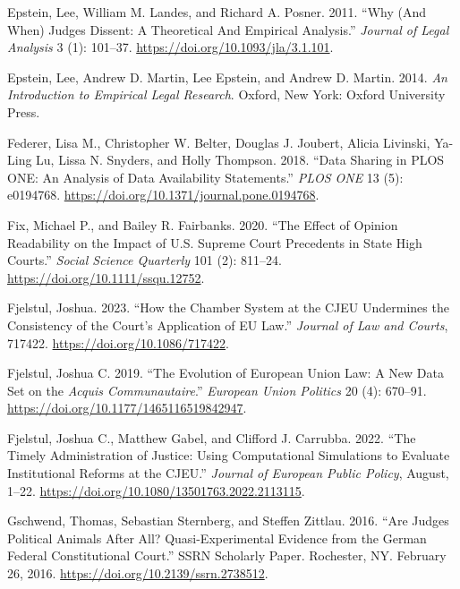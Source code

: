 \documentclass[
  11pt,
]{article}
\newlength{\cslhangindent}
\newenvironment{CSLReferences}[2] %
 {%
  \setlength{\parindent}{0pt}
  \ifodd #1 \everypar{\setlength{\hangindent}{\cslhangindent}}\ignorespaces\fi
  \ifnum #2 > 0
  \setlength{\parskip}{#2\baselineskip}
  \fi
 }%
 {}
\begin{document}
\begin{CSLReferences}{1}{0}
\leavevmode{}%
Epstein, Lee, William M. Landes, and Richard A. Posner. 2011. {``Why
({And When}) {Judges Dissent}: {A Theoretical And Empirical
Analysis}.''} \emph{Journal of Legal Analysis} 3 (1): 101--37.
\url{https://doi.org/10.1093/jla/3.1.101}.

\leavevmode{}%
Epstein, Lee, Andrew D. Martin, Lee Epstein, and Andrew D. Martin. 2014.
\emph{An {Introduction} to {Empirical Legal Research}}. {Oxford, New
York}: {Oxford University Press}.

\leavevmode{}%
Federer, Lisa M., Christopher W. Belter, Douglas J. Joubert, Alicia
Livinski, Ya-Ling Lu, Lissa N. Snyders, and Holly Thompson. 2018.
{``Data Sharing in {PLOS ONE}: {An} Analysis of {Data Availability
Statements}.''} \emph{PLOS ONE} 13 (5): e0194768.
\url{https://doi.org/10.1371/journal.pone.0194768}.

\leavevmode{}%
Fix, Michael P., and Bailey R. Fairbanks. 2020. {``The {Effect} of
{Opinion Readability} on the {Impact} of {U}.{S}. {Supreme Court
Precedents} in {State High Courts}.''} \emph{Social Science Quarterly}
101 (2): 811--24. \url{https://doi.org/10.1111/ssqu.12752}.

\leavevmode{}%
Fjelstul, Joshua. 2023. {``How the {Chamber System} at the {CJEU
Undermines} the {Consistency} of the {Court}'s {Application} of {EU
Law}.''} \emph{Journal of Law and Courts}, 717422.
\url{https://doi.org/10.1086/717422}.

\leavevmode{}%
Fjelstul, Joshua C. 2019. {``The Evolution of {European Union} Law: {A}
New Data Set on the {\emph{Acquis Communautaire}}.''} \emph{European
Union Politics} 20 (4): 670--91.
\url{https://doi.org/10.1177/1465116519842947}.

\leavevmode{}%
Fjelstul, Joshua C., Matthew Gabel, and Clifford J. Carrubba. 2022.
{``The Timely Administration of Justice: Using Computational Simulations
to Evaluate Institutional Reforms at the {CJEU}.''} \emph{Journal of
European Public Policy}, August, 1--22.
\url{https://doi.org/10.1080/13501763.2022.2113115}.

\leavevmode{}%
Gschwend, Thomas, Sebastian Sternberg, and Steffen Zittlau. 2016. {``Are
{Judges Political Animals} After {All}? {Quasi-Experimental Evidence}
from the {German Federal Constitutional Court}.''} SSRN Scholarly Paper.
{Rochester, NY}. February 26, 2016.
\url{https://doi.org/10.2139/ssrn.2738512}.


\end{CSLReferences}
\end{document}
